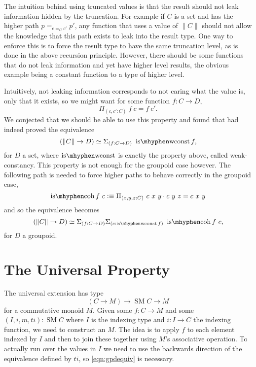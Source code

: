 \documentclass[12pt, parskip, DIV=14]{scrbook}
\newcommand{\defeq}{\vcentcolon\equiv}
\newcommand{\SM}{\operatorname{SM}}
\newcommand{\iswconst}{\operatorname{is\mhyphen wconst}}
\newcommand{\iscoh}{\operatorname{is\mhyphen coh}}
\begin{document}
The intuition behind using truncated values is that the result should not leak information hidden by the truncation. For example if $C$ is a set and has the higher path $p =_{c =_C c'} p'$, any function that uses a value of $\| C \|$ should not allow the knowledge that this path exists to leak into the result type. One way to enforce this is to force the result type to have the same truncation level, as is done in the above recursion principle. However, there should be some functions that do not leak information and yet have higher level results, the obvious example being a constant function to a type of higher level.

Intuitively, not leaking information corresponds to not caring what the value is, only that it exists, so we might want for some function $f : C \to D$,
\begin{equation}
\label{eqn:wconst}
\Pi_{(c, c' : C)}~f~c = f~c'.
\end{equation}
We conjected that we should be able to use this property and found that \citet{kraus2014general} had indeed proved the equivalence
$$(\| C \| \to D) \simeq \Sigma_{(f : C \to D)}~\iswconst f,$$ for $D$ a set, where $\iswconst$ is exactly the property above, called weak-constancy. This property is not enough for the groupoid case however. The following path is needed to force higher paths to behave correctly in the groupoid case,
\begin{equation}
\label{eqn:coh}
\iscoh f~c \defeq \Pi_{(x , y , z : C)}~c~x~y \cdot c~y~z = c~x~y
\end{equation}
and so the equivalence becomes
\begin{equation}
\label{eqn:gpdequiv}
(\| C \| \to D) \simeq \Sigma_{(f : C \to D)}\Sigma_{(c : \iswconst f)}~\iscoh f~c,
\end{equation}
for $D$ a groupoid.

\section{The Universal Property}

The universal extension has type
$$(C \to M) \to \SM C \to M$$
for a commutative monoid $M$. Given some $f : C \to M$ and some $(I , i , m , ti) : \SM C$ where $I$ is the indexing type and $i : I \to C$ the indexing function, we need to construct an $M$. The idea is to apply $f$ to each element indexed by $I$ and then to join these together using $M$'s associative operation. To actually run over the values in $I$ we need to use the backwards direction of the equivalence defined by $ti$, so \cref{eqn:gpdequiv} is necessary.
\end{document}
